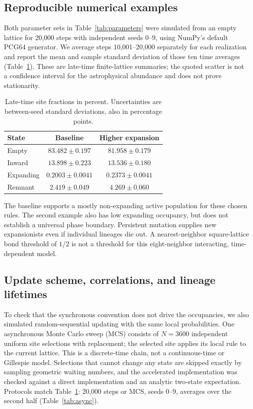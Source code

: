 \documentclass[10pt,twocolumn]{article}
\begin{document}
\subsection{Reproducible numerical examples}
Both parameter sets in Table~\ref{tab:parameters} were simulated from an
empty lattice for 20,000 steps with independent seeds 0--9, using NumPy's
default PCG64 generator. We average steps 10,001--20,000 separately for
each realization and report the mean and sample standard deviation of
those ten time averages (Table~\ref{tab:dynamics}). These are late-time
finite-lattice summaries; the quoted scatter is not a confidence interval
for the astrophysical abundance and does not prove stationarity.

\begin{table}[ht]
\centering
\caption{Late-time site fractions in percent. Uncertainties are between-seed
standard deviations, also in percentage points.}
\begin{tabular}{lcc}
\toprule
State & Baseline & Higher expansion\\
\midrule
Empty & $83.482\pm0.197$ & $81.958\pm0.179$\\
Inward & $13.898\pm0.223$ & $13.536\pm0.180$\\
Expanding & $0.2003\pm0.0041$ & $0.2373\pm0.0041$\\
Remnant & $2.419\pm0.049$ & $4.269\pm0.060$\\
\bottomrule
\end{tabular}
\label{tab:dynamics}
\end{table}

The baseline supports a mostly non-expanding active population for these
chosen rules. The second example also has low expanding occupancy, but
does not establish a universal phase boundary. Persistent mutation
supplies new expansionists even if individual lineages die out.
A nearest-neighbor square-lattice bond threshold of $1/2$ is not a
threshold for this eight-neighbor interacting, time-dependent model.

\subsection{Update scheme, correlations, and lineage lifetimes}
To check that the synchronous convention does not drive the occupancies,
we also simulated random-sequential updating with the same local
probabilities. One asynchronous Monte Carlo sweep (MCS) consists of
$N=3600$ independent uniform site selections with replacement; the
selected site applies its local rule to the current lattice. This is a
discrete-time chain, not a continuous-time or Gillespie model.
Selections that cannot change any state are skipped exactly by sampling
geometric waiting numbers, and the accelerated implementation was
checked against a direct implementation and an analytic two-state
expectation. Protocols match Table~\ref{tab:dynamics}: 20,000 steps
or MCS, seeds 0--9, averages over the second half
(Table~\ref{tab:async}).
\end{document}
